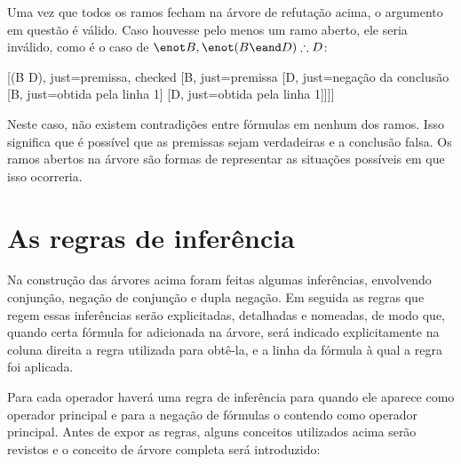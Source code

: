Uma vez que todos os ramos fecham na árvore de refutação acima, o argumento em questão é válido.
Caso houvesse pelo menos um ramo aberto, ele seria inválido, como é o caso de $\enot B, \enot(B \eand D) \therefore D$:

\begin{center}
\begin{tableau}
	{
	}
	[\enot(B \eand D), just={premissa}, checked
	[\enot B, just={premissa}
	[\enot D, just={negação da conclusão}
		[\enot B, just={obtida pela linha 1}]
		[\enot D, just={obtida pela linha 1}]]]]
\end{tableau}
\end{center}

Neste caso, não existem contradições entre fórmulas em nenhum dos ramos.
Isso significa que é possível que as premissas sejam verdadeiras e a conclusão falsa.
Os ramos abertos na árvore são formas de representar as situações possíveis em que isso ocorreria.

\section{As regras de inferência}

Na construção das árvores acima foram feitas algumas inferências, envolvendo conjunção, negação de conjunção e dupla negação.
Em seguida as regras que regem essas inferências serão explicitadas, detalhadas e nomeadas, de modo que, quando certa fórmula for adicionada na árvore, será indicado explicitamente na coluna direita a regra utilizada para obtê-la, e a linha da fórmula à qual a regra foi aplicada.

Para cada operador haverá uma regra de inferência para quando ele aparece como operador principal e para a negação de fórmulas o contendo como operador principal.
Antes de expor as regras, alguns conceitos utilizados acima serão revistos e o conceito de árvore completa será introduzido: 


